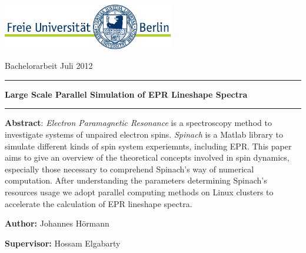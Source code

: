 \documentclass[11.5pt,a4paper]{article}
\begin{document}
\setlength{\parindent}{0pt} %


\thispagestyle{empty}

\includegraphics[height=2cm]{FULogo.jpg}
\hfill %
\parbox[b]{0.5\textwidth}{{\large Bachelorarbeit Juli 2012\\}}

\vspace{2cm}

\begin{center}

\rule[11pt]{15cm}{0.5pt}

{ \textbf {\Large Large Scale Parallel Simulation of EPR Lineshape Spectra}}

\rule{15cm}{0.5pt}

\vspace{1cm}

\parbox{15cm}{\small
\textbf{Abstract}: \emph{Electron Paramagnetic Resonance} is a spectroscopy method to investigate systems of unpaired electron spins. \emph{Spinach} is a Matlab library to simulate different kinds of spin system experiemnts, including EPR. This paper aims to give an overview of the theoretical concepts involved in spin dynamics, especially those necessary to comprehend  Spinach's way of numerical computation. After understanding the parameters determining Spinach's resources usage we adopt parallel computing methods on Linux clusters to accelerate the calculation of EPR lineshape spectra.  }

\vspace{0.5cm}

\end{center}

\vspace{1cm}

\large{

{\bf Author:}  Johannes H\"ormann}
\vspace{0.3cm}

{\bf Supervisor:} Hossam Elgabarty

\vspace{1cm}
\end{document}
